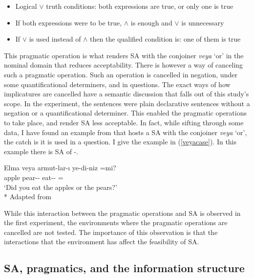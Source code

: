 \begin{itemize}
    \item Logical $\vee$ truth conditions: both expressions are true, or only one is true
    \item If both expressions were to be true, $\wedge$ is enough and $\vee$ is unnecessary
    \item If $\vee$ is used instead of $\wedge$ then the qualified condition is: one of them is true
\end{itemize}

This pragmatic operation is what renders {\Case} SA with the conjoiner \textit{veya} `or' in the nominal domain that reduces acceptability. There is however a way of canceling such a pragmatic operation. Such an operation is cancelled in negation, under some quantificational determiners, and in questions. The exact ways of how implicatures are cancelled have a semantic discussion that falls out of this study's scope. In the experiment, the sentences were plain declarative sentences without a negation or a quantificational determiner. This enabled the pragmatic operations to take place, and render {\Case} SA less acceptable. In fact, while sifting through some data, I have found an example from \cite[p.24]{johannessen1998coordination} that hosts a {\Case} SA with the conjoiner \textit{veya} `or', the catch is it is used in a question. I give the example in (\ref{veyacase}). In this example there is SA of {\Pl-\Case}.

\begin{exe}
    \ex \label{veyacase} 
    \gll Elma veya armut-lar-ı ye-di-niz =mi? \\ 
    apple {\Or} pear-{\Pl}-{\Acc} eat-{\Pst}-{\Spl} ={\Q} \\
    \glt `Did you eat the apples or the pears?' \\*
    \hfill Adapted from \cite{johannessen1998coordination}
\end{exe}

While this interaction between the pragmatic operations and {\Case} SA is observed in the first experiment, the environments where the pragmatic operations are cancelled are not tested. The importance of this observation is that the interactions that the environment has affect the feasibility of SA.


\subsection{SA, pragmatics, and the information structure}

